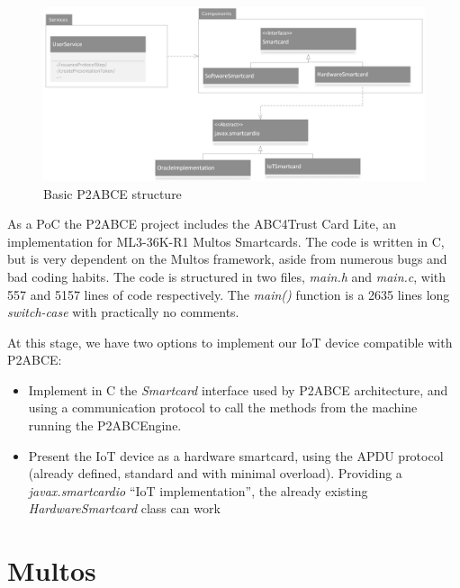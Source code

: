 \begin{figure}[bth]
	\begin{center}
		\includegraphics[width=\linewidth]{gfx/p2abceBasicUML}
	\end{center}
	\caption{Basic P2ABCE structure}
	\label{fig:p2abceBasicUML}
\end{figure}


As a PoC the P2ABCE project includes the ABC4Trust Card Lite, an implementation for ML3-36K-R1 Multos Smartcards. The code is written in C, but is very dependent on the Multos framework, aside from numerous bugs and bad coding habits. The code is structured in two files, \textit{main.h} and \textit{main.c}, with 557 and 5157 lines of code respectively. The \textit{main()} function is a 2635 lines long \textit{switch-case} with practically no comments.



At this stage, we have two options to implement our IoT device compatible with P2ABCE:

\begin{itemize}
	\item Implement in C the \textit{Smartcard} interface used by P2ABCE architecture, and using a communication protocol to call the methods from the machine running the P2ABCEngine.
	\item Present the IoT device as a hardware smartcard, using the APDU protocol (already defined, standard and with minimal overload). Providing a \textit{javax.smartcardio} ``IoT implementation'', the already existing \textit{HardwareSmartcard} class can work 
\end{itemize}




\section{Multos}